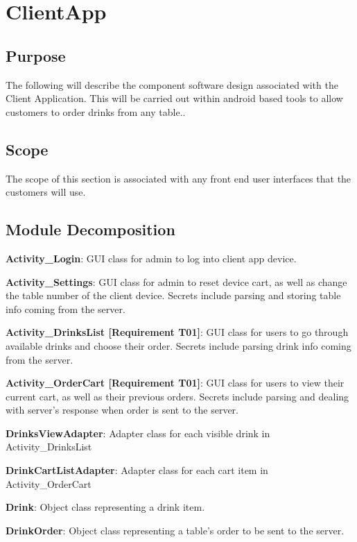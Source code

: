 \documentclass [10pt]{article}
\begin{document}

\section {ClientApp}

\subsection{Purpose}
The following will describe the component software design associated with the Client Application. This will be carried out within android based tools to allow customers to order drinks from any table..

\subsection{Scope}
The scope of this section is associated with any front end user interfaces that the customers will use.

\subsection{Module Decomposition}

\textbf{Activity\_Login}: GUI class for admin to log into client app device.

\textbf{Activity\_Settings}: GUI class for admin to reset device cart, as well as change the table number of the client device. Secrets include parsing and storing table info coming from the server.

\textbf{Activity\_DrinksList [Requirement T01]}: GUI class for users to go through available drinks and choose their order. Secrets include parsing drink info coming from the server.

\textbf{Activity\_OrderCart [Requirement T01]}: GUI class for users to view their current cart, as well as their previous orders. Secrets include parsing and dealing with server's response when order is sent to the server.

\textbf{DrinksViewAdapter}: Adapter class for each visible drink in Activity\_DrinksList

\textbf{DrinkCartListAdapter}: Adapter class for each cart item in Activity\_OrderCart

\textbf{Drink}: Object class representing a drink item.

\textbf{DrinkOrder}: Object class representing a table's order to be sent to the server. 
\end{document}
